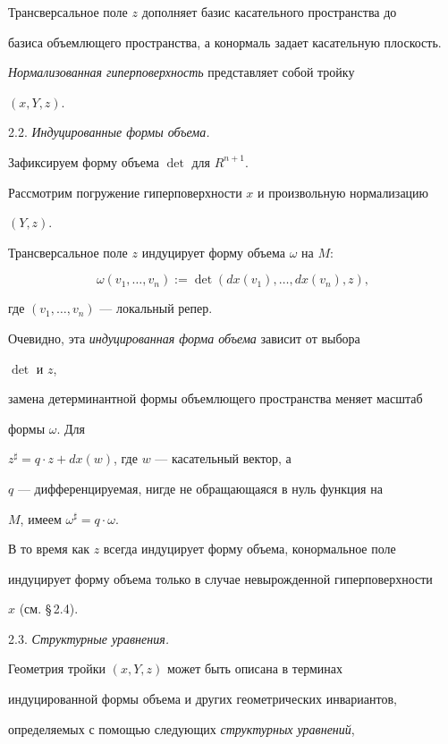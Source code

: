 Трансверсальное поле $z$ дополняет базис касательного пространства до


базиса объемлющего пространства, а конормаль задает касательную плоскость.


{\it Нормализованная гиперповерхность} представляет собой тройку


$(x,Y,z)$.


\medskip





2.2. {\it Индуцированные формы объема.}


Зафиксируем форму объема $\det$ для $R^{n+1}$.


Рассмотрим погружение гиперповерхности $x$ и произвольную нормализацию


$(Y,z)$.


Трансверсальное поле $z$ индуцирует форму объема $\omega$ на $M$:


$$


\omega (v_1, \dotsc, v_n) := \det(dx(v_1), \dotsc, dx(v_n),z),


$$


где $(v_1, \dotsc, v_n)$ --- локальный репер.


Очевидно, эта {\it индуцированная форма объема} зависит от выбора


$\det$ и $z$,


замена детерминантной формы объемлющего пространства меняет масштаб


формы $\omega$. Для


$z^{\sharp}= q \cdot z +dx(w)$, где $w$ --- касательный вектор, а


$q$ --- дифференцируемая, нигде не обращающаяся в нуль функция на


$M$, имеем $\omega^{\sharp} = q \cdot \omega$.


В то время как $z$ всегда индуцирует форму объема, конормальное поле


индуцирует форму объема только в случае невырожденной гиперповерхности


$x$ (см. \S\,2.4).


\medskip





2.3. {\it Структурные уравнения.}


Геометрия тройки $(x,Y,z)$ может быть описана в терминах


индуцированной формы объема и других геометрических инвариантов,


определяемых с помощью следующих {\it структурных уравнений},


